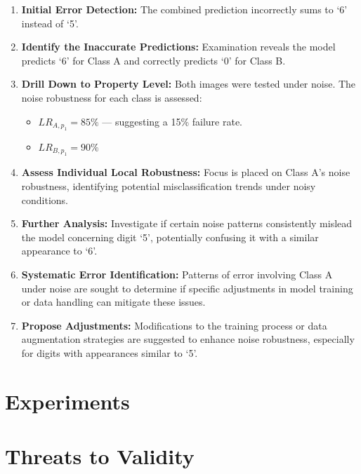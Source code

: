 \documentclass[10pt, conference, a4paper, final]{IEEEtran}
\begin{document}
\begin{enumerate}
    \item \textbf{Initial Error Detection:}
        The combined prediction incorrectly sums to `6' instead of `5'.

    \item \textbf{Identify the Inaccurate Predictions:}
        Examination reveals the model predicts `6' for Class A and correctly predicts `0' for Class B.

    \item \textbf{Drill Down to Property Level:}
        Both images were tested under noise. The noise robustness for each class is assessed:
        \begin{itemize}
            \item \( LR_{A,p_1} = 85\% \) — suggesting a 15\% failure rate.
            \item \( LR_{B,p_1} = 90\% \)
        \end{itemize}

    \item \textbf{Assess Individual Local Robustness:}
        Focus is placed on Class A's noise robustness, identifying potential misclassification trends under noisy conditions.

    \item \textbf{Further Analysis:}
        Investigate if certain noise patterns consistently mislead the model concerning digit `5', potentially confusing it with a similar appearance to `6'.

    \item \textbf{Systematic Error Identification:}
        Patterns of error involving Class A under noise are sought to determine if specific adjustments in model training or data handling can mitigate these issues.

    \item \textbf{Propose Adjustments:}
        Modifications to the training process or data augmentation strategies are suggested to enhance noise robustness, especially for digits with appearances similar to `5'.
\end{enumerate}





\section{Experiments}


\section{Threats to Validity}
\end{document}
